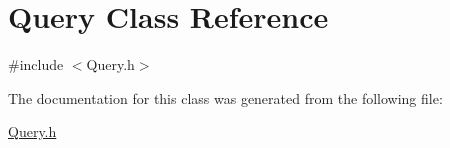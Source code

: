 \hypertarget{class_query}{}\section{Query Class Reference}
\label{class_query}


{\ttfamily \#include $<$Query.\+h$>$}



The documentation for this class was generated from the following file\+:\begin{DoxyCompactItemize}
\item 
\hyperlink{_query_8h}{Query.\+h}\end{DoxyCompactItemize}
